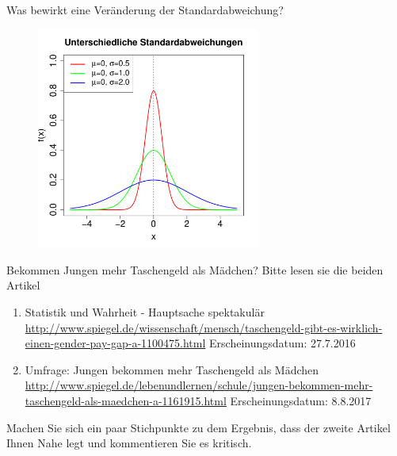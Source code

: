 \documentclass[usenames,dvipsnames,handout]{beamer}
\begin{document}
\begin{frame}{Was bewirkt eine Veränderung der Standardabweichung?}
        \begin{figure}[ht]
 	\centering
 	      \includegraphics[width=0.65\textwidth]{diffnorm1.pdf}
 	\end{figure}
\end{frame}


\begin{frame}{Bekommen Jungen mehr Taschengeld als Mädchen?}
Bitte lesen sie die beiden Artikel 
\begin{enumerate}
\item{ \colorbox{yellow!20}{Statistik und Wahrheit - Hauptsache spektakulär} \footnotesize{ \url{http://www.spiegel.de/wissenschaft/mensch/taschengeld-gibt-es-wirklich-einen-gender-pay-gap-a-1100475.html} } 
Erscheinungsdatum: 27.7.2016}
\item{ \colorbox{yellow!20}{ Umfrage: Jungen bekommen mehr Taschengeld als Mädchen} \footnotesize{ \url{http://www.spiegel.de/lebenundlernen/schule/jungen-bekommen-mehr-taschengeld-als-maedchen-a-1161915.html} }
Erscheinungsdatum:  8.8.2017}
\end{enumerate}
\colorbox{green!20}{Machen Sie sich ein paar Stichpunkte zu dem Ergebnis, }
\colorbox{green!20}{dass der zweite Artikel Ihnen Nahe legt und kommentieren Sie es kritisch.}
\end{frame}
\end{document}
